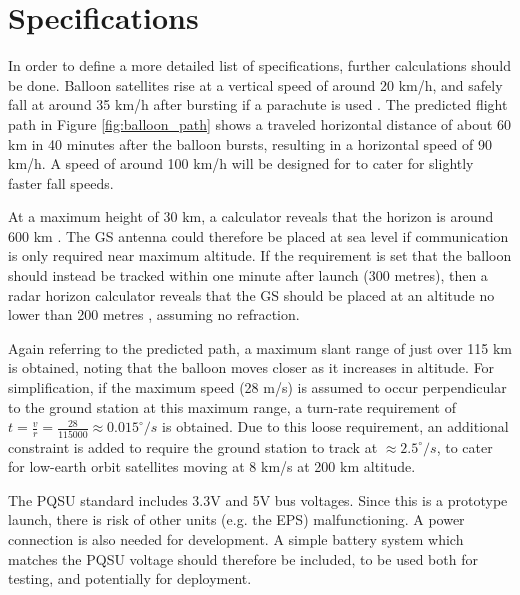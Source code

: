 \graphicspath{{./figures}}

\section{Specifications}

In order to define a more detailed list of specifications, further calculations should be done. Balloon satellites rise at a vertical speed of around 20 km/h, and safely fall at around 35 km/h after bursting if a parachute is used \cite{site-weatherWeatherBalloons}. The predicted flight path in Figure \ref{fig:balloon_path} shows a traveled horizontal distance of about 60 km in 40 minutes after the balloon bursts, resulting in a horizontal speed of 90 km/h. A speed of around 100 km/h will be designed for to cater for slightly faster fall speeds.

At a maximum height of 30 km, a calculator reveals that the horizon is around 600 km \cite{site-normalHorizon}. The GS antenna could therefore be placed at sea level if communication is only required near maximum altitude. If the requirement is set that the balloon should instead be tracked within one minute after launch (300 metres), then a radar horizon calculator reveals that the GS should be placed at an altitude no lower than 200 metres \cite{site-radarHorizon}, assuming no refraction.

Again referring to the predicted path, a maximum slant range of just over 115 km is obtained, noting that the balloon moves closer as it increases in altitude. For simplification, if the maximum speed (28 m/s) is assumed to occur perpendicular to the ground station at this maximum range, a turn-rate requirement of $t = \frac{v}{r} = \frac{28}{115000} \approx 0.015^\circ / s$ is obtained. Due to this loose requirement, an additional constraint is added to require the ground station to track at $\approx 2.5^\circ / s$, to cater for low-earth orbit satellites moving at 8 km/s at 200 km altitude.

The PQSU standard includes 3.3V and 5V bus voltages. Since this is a prototype launch, there is risk of other units (e.g. the EPS) malfunctioning. A power connection is also needed for development. A simple battery system which matches the PQSU voltage should therefore be included, to be used both for testing, and potentially for deployment.

